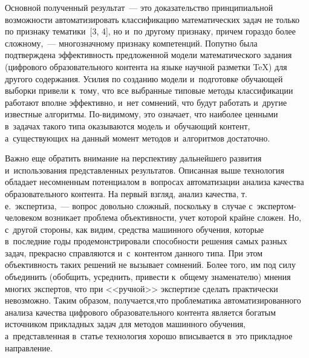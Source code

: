 \begin{multicols}{2}
     Основной полученный результат~--- это доказательство 
принципиальной возможности автоматизировать классификацию 
математических задач не только по признаку тематики~[3, 4], но и~по 
другому признаку, причем гораздо более сложному,~--- многозначному 
признаку компетенций. Попутно была подтверждена эффективность 
предложенной модели математического задания (цифрового 
образовательного контента на языке научной разметки \TeX) для другого 
содержания. Усилия по созданию модели и~подготовке обучающей выборки 
привели к~тому, что все выбранные типовые методы классификации 
работают вполне эффективно, и~нет сомнений, что будут работать и~другие 
известные алгоритмы. По-ви\-ди\-мо\-му, это означает, что наиболее 
ценными в~задачах такого типа оказываются модель и~обучающий контент, 
а~существующих на данный момент методов и~алгоритмов достаточно.
     
     Важно еще обратить внимание на перспективу дальнейшего развития и~использования пред\-став\-лен\-ных результатов. Описанная выше технология 
обладает несомненным потенциалом в~вопросах автоматизации анализа 
качества образовательного контента. На первый взгляд, анализ качества, 
т.\,е.\ экспертиза,~--- вопрос довольно сложный, поскольку в~случае с~экс\-пер\-том-че\-ло\-ве\-ком возникает проб\-ле\-ма объ\-ек\-тив\-ности, учет которой крайне сложен. 
Но, с~другой стороны, как видим, средства машинного обучения, которые в~последние годы продемонстрировали способности решения самых разных 
задач, прекрасно справляются и~с~контентом данного типа. При этом 
объективность таких решений не вызывает сомнений. Более того, им под 
силу объединить (обобщить, усреднить, при\-вес\-ти к~общему знаменателю) 
мнения многих экспертов, что при <<ручной>> экспертизе сделать практически 
невозможно. Таким образом, получается,\linebreak что проб\-ле\-ма\-ти\-ка 
автоматизированного анализа качества циф\-ро\-во\-го образовательного 
контента является богатым источником при\-клад\-ных задач для 
методов машинного обуче\-ния, а~пред\-став\-лен\-ная в~статье технология хорошо 
вписывается в~это при\-клад\-ное на\-прав\-ление.


\end{multicols}
